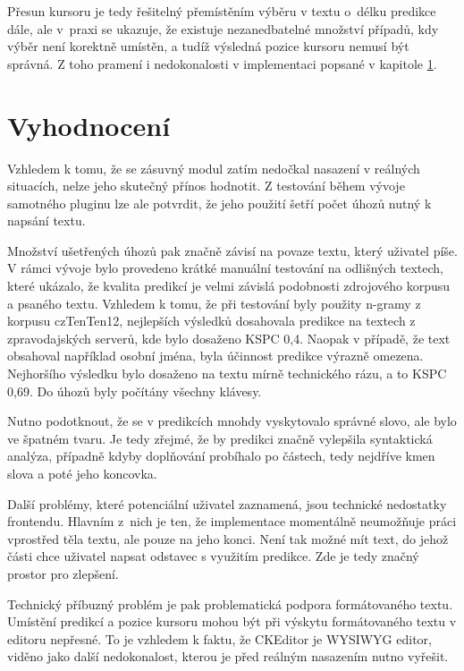 \documentclass[a4paper,11pt,openany]{book} %
\begin{document}
Přesun kursoru je tedy řešitelný přemístěním výběru v textu o~délku predikce dále, ale v~praxi se ukazuje, že existuje nezanedbatelné množství případů, kdy výběr není korektně umístěn, a tudíž výsledná pozice kursoru nemusí být správná. Z toho pramení i nedokonalosti v implementaci popsané v kapitole \ref{vyhodnoceni}.

\chapter{Vyhodnocení}\label{vyhodnoceni}

Vzhledem k tomu, že se zásuvný modul zatím nedočkal nasazení v reálných situacích, nelze jeho skutečný přínos hodnotit. Z testování během vývoje samotného pluginu lze ale potvrdit, že jeho použití šetří počet úhozů nutný k napsání textu. 

Množství ušetřených úhozů pak značně závisí na povaze textu, který uživatel píše. V rámci vývoje bylo provedeno krátké manuální testování na odlišných textech, které ukázalo, že kvalita predikcí je velmi závislá podobnosti zdrojového korpusu a psaného textu. Vzhledem k tomu, že při testování byly použity n-gramy z korpusu czTenTen12, nejlepších výsledků dosahovala predikce na textech z zpravodajských serverů, kde bylo dosaženo KSPC 0,4. Naopak v případě, že text obsahoval například osobní jména, byla účinnost predikce výrazně omezena. Nejhoršího výsledku bylo dosaženo na textu mírně technického rázu, a to KSPC 0,69. Do úhozů byly počítány všechny klávesy.

Nutno podotknout, že se v predikcích mnohdy vyskytovalo správné slovo, ale bylo ve špatném tvaru. Je tedy zřejmé, že by predikci značně vylepšila syntaktická analýza, případně kdyby doplňování probíhalo po částech, tedy nejdříve kmen slova a poté jeho koncovka.

Další problémy, které potenciální uživatel zaznamená, jsou technické nedostatky frontendu. Hlavním z~nich je ten, že implementace momentálně neumožňuje práci vprostřed těla textu, ale pouze na jeho konci. Není tak možné mít text, do jehož části chce uživatel napsat odstavec s využitím predikce. Zde je tedy značný prostor pro zlepšení.

Technický příbuzný problém je pak problematická podpora formátovaného textu. Umístění predikcí a pozice kursoru mohou být při výskytu formátovaného textu v editoru nepřesné. To je vzhledem k faktu, že CKEditor je WYSIWYG editor, viděno jako další nedokonalost, kterou je před reálným nasazením nutno vyřešit.
\end{document}
